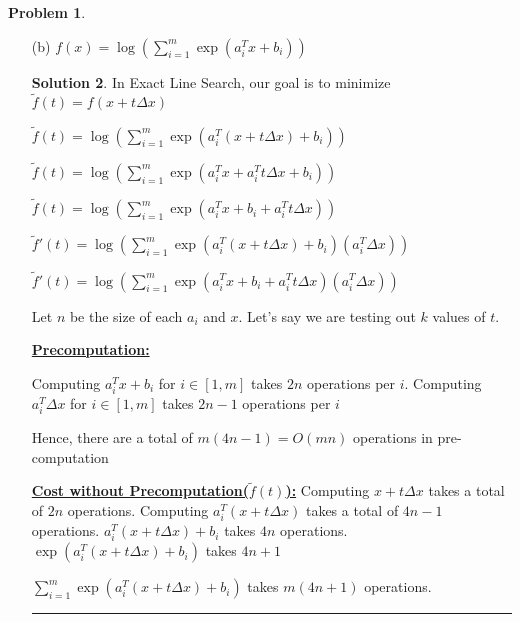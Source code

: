 \documentclass{article}
\theoremstyle{definition}
\newtheorem{problem}{Problem}
\def\fline{\rule{0.75\linewidth}{0.5pt}}
\newcommand{\finishline}{\begin{center}\fline\end{center}}
\newtheorem*{solution*}{Solution}
\newenvironment{solution}{\begin{solution*}}{{\finishline} \end{solution*}}
\begin{document}
\begin{problem}
\begin{enumerate}
\begin{solution}
Since we are testing out $k$ values of $t$, this requires $5mk + k$ \newline 


    \end{solution}
 
    \item[(b)] $f(x) = \log(\sum_{i=1}^{m} \exp(a_i^Tx + b_i))$ 

    \begin{solution}
         In Exact Line Search, our goal is to minimize $\tilde{f}(t) =  f(x + t\Delta x)$

         $\tilde{f}(t) =  \log(\sum_{i=1}^{m} \exp(a_i^T(x + t\Delta x) + b_i))$ \newline 

         $\tilde{f}(t) =  \log(\sum_{i=1}^{m} \exp(a_i^Tx + a_i^T t\Delta x + b_i))$

        $\tilde{f}(t) =  \log(\sum_{i=1}^{m} \exp(a_i^Tx + b_i + a_i^T t\Delta x))$


        $\tilde{f}'(t) =  \log(\sum_{i=1}^{m} \exp(a_i^T(x + t\Delta x) + b_i) (a_i^T \Delta x))$

        
        $\tilde{f}'(t) =  \log(\sum_{i=1}^{m} \exp(a_i^Tx + b_i + a_i^T t\Delta x) (a_i^T \Delta x))$

        Let $n$ be the size of each $a_i$ and $x$. Let's say we are testing out $k$ values of $t$. 

        \textbf{\underline{Precomputation:}} \newline  
        
        Computing $a_i^Tx + b_i$ for $i \in [1, m]$ takes $2n$ operations per $i$. \newline 
        Computing $a_i^T \Delta x$ for $i \in [1, m]$ takes $2n - 1$ operations per $i$

        Hence, there are a total of $m(4n - 1) = O(mn)$ operations in pre-computation \newline

        
        \textbf{\underline{Cost without Precomputation($\tilde{f}(t)$):}} \newline 
        Computing $x + t \Delta x$ takes a total of $2n$ operations. Computing $a_i^T(x + t \Delta x)$ takes a total of $4n - 1$ operations. $a_i^T(x + t\Delta x) + b_i$ takes $4n$ operations. $\exp(a_i^T(x + t\Delta x) + b_i)$ takes $4n + 1$  
        
        $\sum_{i=1}^{m} \exp(a_i^T(x + t\Delta x) + b_i)$ takes $m(4n + 1)$ operations. 
        

\end{solution}
\end{enumerate}
\end{problem}
\end{document}
